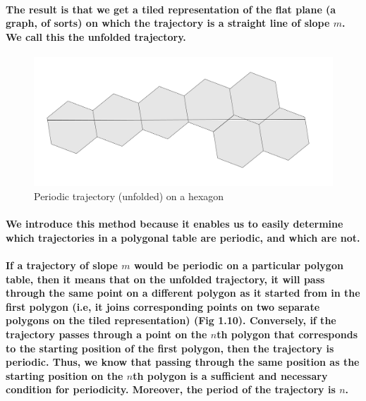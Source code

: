 \documentclass{report}
\begin{document}
\paragraph{The result is that we get a tiled representation of the flat plane (a graph, of sorts) on which the trajectory is a straight line of slope $m$. We call this the unfolded trajectory.}


\begin{figure} 
\begin{center}
\includegraphics[scale=0.3]{10}
\caption{Periodic trajectory (unfolded) on a hexagon}
\end{center}
\end{figure}

\pagebreak

\paragraph{We introduce this method because it enables us to easily determine which trajectories in a polygonal table are periodic, and which are not.}

\paragraph{If a trajectory of slope $m$ would be periodic on a particular polygon table, then it means that on the unfolded trajectory, it will pass through the same point on a different polygon as it started from in the first polygon (i.e, it joins corresponding points on two separate polygons on the tiled representation) (Fig 1.10). Conversely, if the trajectory passes through a point on the $n$th polygon that corresponds to the starting position of the first polygon, then the trajectory is periodic. Thus, we know that passing through the same position as the starting position on the $n$th polygon is a sufficient and necessary condition for periodicity. Moreover, the period of the trajectory is $n$.}
\end{document}

